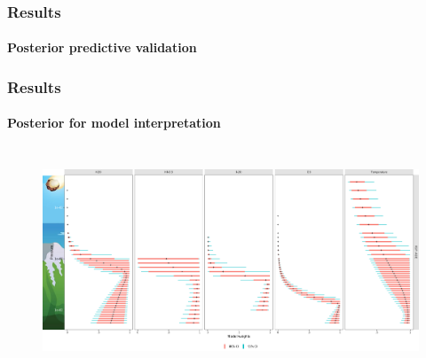 \documentclass{snedecorbeamer}
\begin{document}
\begin{frame}[c]
  \frametitle{Results}
  \framesubtitle{Posterior predictive validation}

  \begin{table}
    \caption*{%
      Mean validation statistics:~RMSE (left) and negative PPLD (right).\\
      Smaller values are better. Bold is best in class. \\
      One model fit separately per input.
    }%
    \label{tab:validation-statistics-mini}
  \end{table}

\end{frame}

\begin{frame}
  \frametitle{Results}
  \framesubtitle{Posterior for model interpretation}

  \begin{figure}
      \centering
    \includegraphics[height=18em]{inc/mls_weight_posterior_oaat.png}
  \end{figure}




\end{frame}
\end{document}
